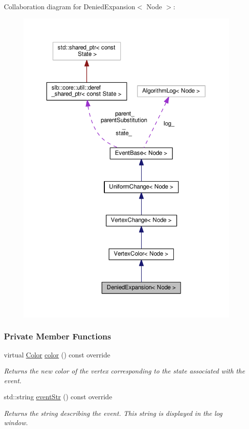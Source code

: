 Collaboration diagram for Denied\+Expansion$<$ Node $>$\+:\nopagebreak
\begin{figure}[H]
\begin{center}
\leavevmode
\includegraphics[width=350pt]{structDeniedExpansion__coll__graph}
\end{center}
\end{figure}
\subsubsection*{Private Member Functions}
\begin{DoxyCompactItemize}
\item 
virtual \hyperlink{colors_8h_ab87bacfdad76e61b9412d7124be44c1c}{Color} \hyperlink{structDeniedExpansion_a63345504b8619889a1d7f8236f037693}{color} () const override
\begin{DoxyCompactList}\small\item\em Returns the new color of the vertex corresponding to the state associated with the event. \end{DoxyCompactList}\item 
std\+::string \hyperlink{structDeniedExpansion_a4e760a5265426ca5f0b4645a477bc91d}{event\+Str} () const override
\begin{DoxyCompactList}\small\item\em Returns the string describing the event. This string is displayed in the log window. \end{DoxyCompactList}\end{DoxyCompactItemize}

